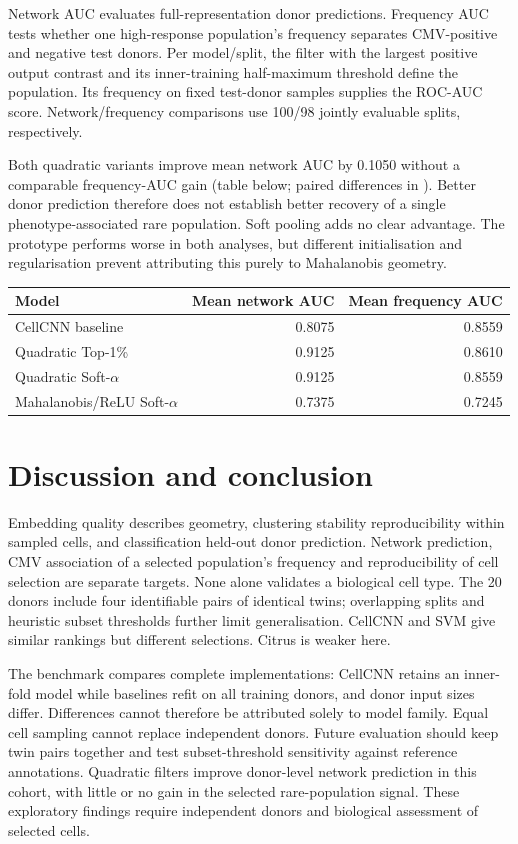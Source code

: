 \documentclass[11pt,a4paper]{article}
\begin{document}
Network AUC evaluates full-representation donor predictions. Frequency AUC tests whether one high-response population's frequency separates CMV-positive and negative test donors. Per model/split, the filter with the largest positive output contrast and its inner-training half-maximum threshold define the population. Its frequency on fixed test-donor samples supplies the ROC-AUC score. Network/frequency comparisons use 100/98 jointly evaluable splits, respectively.

Both quadratic variants improve mean network AUC by 0.1050 without a comparable frequency-AUC gain (table below; paired differences in ). Better donor prediction therefore does not establish better recovery of a single phenotype-associated rare population. Soft pooling adds no clear advantage. The prototype performs worse in both analyses, but different initialisation and regularisation prevent attributing this purely to Mahalanobis geometry.

\begin{center}\small
\begin{tabular}{@{}lrr@{}}\toprule
Model & Mean network AUC & Mean frequency AUC\\\midrule
CellCNN baseline & 0.8075 & 0.8559\\
Quadratic Top-1\% & 0.9125 & 0.8610\\
Quadratic Soft-$\alpha$ & 0.9125 & 0.8559\\
Mahalanobis/ReLU Soft-$\alpha$ & 0.7375 & 0.7245\\\bottomrule
\end{tabular}
\end{center}

\section{Discussion and conclusion}
Embedding quality describes geometry, clustering stability reproducibility within sampled cells, and classification held-out donor prediction. Network prediction, CMV association of a selected population's frequency and reproducibility of cell selection are separate targets. None alone validates a biological cell type. The 20 donors include four identifiable pairs of identical twins; overlapping splits and heuristic subset thresholds further limit generalisation. CellCNN and SVM give similar rankings but different selections. Citrus is weaker here.

The benchmark compares complete implementations: CellCNN retains an inner-fold model while baselines refit on all training donors, and donor input sizes differ. Differences cannot therefore be attributed solely to model family. Equal cell sampling cannot replace independent donors. Future evaluation should keep twin pairs together and test subset-threshold sensitivity against reference annotations. Quadratic filters improve donor-level network prediction in this cohort, with little or no gain in the selected rare-population signal. These exploratory findings require independent donors and biological assessment of selected cells.


\end{document}

